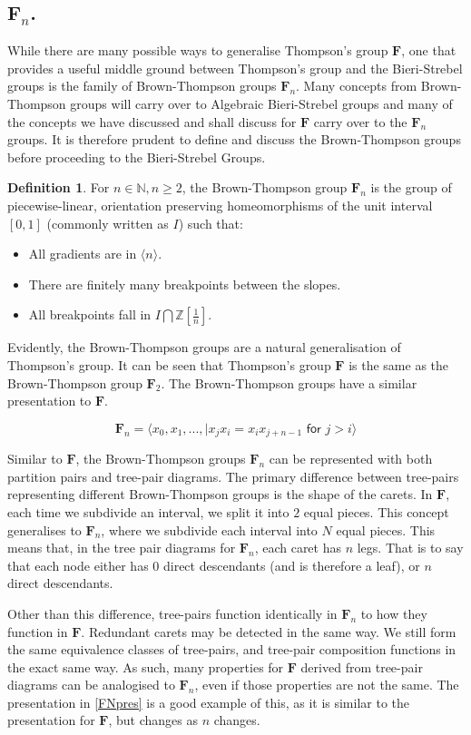 \documentclass[
11pt, %
english, %
singlespacing, %
parskip, %
headsepline, %
]{amsart} %
\theoremstyle{definition}
\newtheorem{definition}[theorem]{Definition}
\newcommand{\TF}{\textbf{F}}
\newcommand{\FN}[1]{$\textbf{F}_{#1}$}
\begin{document}
\subsection{\FN{n}.}\label{fn}
While there are many possible ways to generalise Thompson's group $\TF$, one that provides a useful middle ground between Thompson's group and the Bieri-Strebel groups is the family of Brown-Thompson groups \FN{n}. Many concepts from Brown-Thompson groups will carry over to Algebraic Bieri-Strebel groups and many of the concepts we have discussed and shall discuss for $\TF$ carry over to the \FN{n} groups. It is therefore prudent to define and discuss the Brown-Thompson groups before proceeding to the Bieri-Strebel Groups.

\begin{definition}
For $n \in \mathbb{N}, n \geq 2$, the Brown-Thompson group \FN{n} is the group of piecewise-linear, orientation preserving homeomorphisms of the unit interval $[0,1]$ (commonly written as $I$) such that:

\begin{itemize}
\item All gradients are in $\langle n \rangle$.
\item There are finitely many breakpoints between the slopes.
\item All breakpoints fall in $I \bigcap \mathbb{Z}[\frac{1}{n}]$.
\end{itemize}

\end{definition}

Evidently, the Brown-Thompson groups are a natural generalisation of Thompson's group. It can be seen that Thompson's group $\TF$ is the same as the Brown-Thompson group \FN{2}. The Brown-Thompson groups have a similar presentation to $\TF$.

\begin{equation}\label{FNpres}
\textbf{F}_n = \langle x_0, x_1, ..., | x_j x_i = x_i x_{j+n-1} \textsf{ for } j>i \rangle
\end{equation}

Similar to $\TF$, the Brown-Thompson groups \FN{n} can be represented with both partition pairs and tree-pair diagrams. The primary difference between tree-pairs representing different Brown-Thompson groups is the shape of the carets. In $\TF$, each time we subdivide an interval, we split it into $2$ equal pieces. This concept generalises to \FN{n}, where we subdivide each interval into $N$ equal pieces. This means that, in the tree pair diagrams for \FN{n}, each caret has $n$ legs. That is to say that each node either has $0$ direct descendants (and is therefore a leaf), or $n$ direct descendants.
\par
Other than this difference, tree-pairs function identically in \FN{n} to how they function in $\TF$. Redundant carets may be detected in the same way. We still form the same equivalence classes of tree-pairs, and tree-pair composition functions in the exact same way. As such, many properties for $\TF$ derived from tree-pair diagrams can be analogised to \FN{n}, even if those properties are not the same. The presentation in \ref{FNpres} is a good example of this, as it is similar to the presentation for $\TF$, but changes as $n$ changes. 
\end{document}
